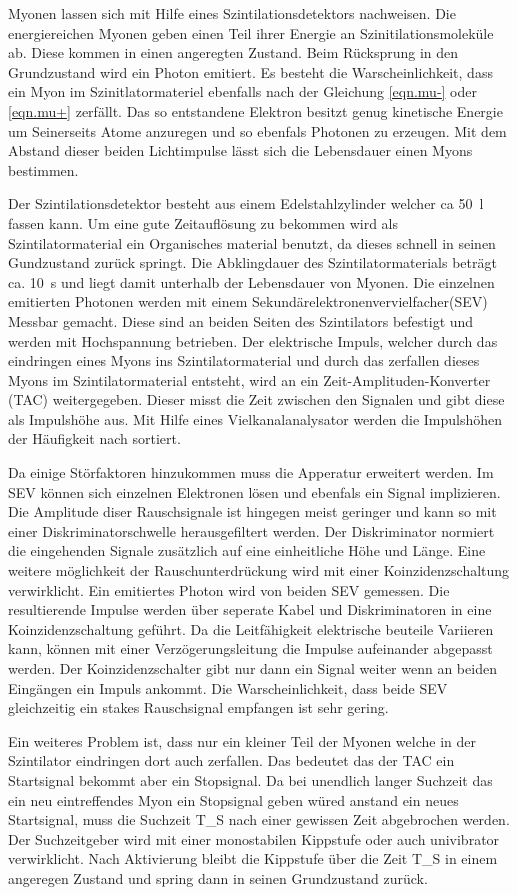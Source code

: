 Myonen lassen sich mit Hilfe eines Szintilationsdetektors nachweisen.
Die energiereichen Myonen geben einen Teil ihrer Energie an Szinitilationsmoleküle ab.
Diese kommen in einen angeregten Zustand.
Beim Rücksprung in den Grundzustand wird ein Photon emitiert.
Es besteht die Warscheinlichkeit, dass ein Myon im Szinitlatormateriel ebenfalls nach der Gleichung \ref{eqn.mu-}
oder \ref{eqn.mu+} zerfällt.
Das so entstandene Elektron besitzt genug kinetische Energie um Seinerseits Atome anzuregen und so ebenfals Photonen zu erzeugen.
Mit dem Abstand dieser beiden Lichtimpulse lässt sich die Lebensdauer einen Myons bestimmen.

Der Szintilationsdetektor besteht aus einem Edelstahlzylinder welcher ca \SI{50}{l} fassen kann.
Um eine gute Zeitauflösung zu bekommen wird als Szintilatormaterial ein Organisches material benutzt,
da dieses schnell in seinen Gundzustand zurück springt.
Die Abklingdauer des Szintilatormaterials beträgt ca. \SI{10}{s} und liegt damit unterhalb der Lebensdauer von Myonen.
Die einzelnen emitierten Photonen werden mit einem Sekundärelektronenvervielfacher(SEV) Messbar gemacht.
Diese sind an beiden Seiten des Szintilators befestigt und werden mit Hochspannung betrieben.
Der elektrische Impuls, welcher durch das eindringen eines Myons ins Szintilatormaterial
und durch das zerfallen dieses Myons im Szintilatormaterial entsteht,
wird an ein Zeit-Amplituden-Konverter (TAC) weitergegeben.
Dieser misst die Zeit zwischen den Signalen und gibt diese als Impulshöhe aus.
Mit Hilfe eines Vielkanalanalysator werden die Impulshöhen der Häufigkeit nach sortiert.

Da einige Störfaktoren hinzukommen muss die Apperatur erweitert werden.
Im SEV können sich einzelnen Elektronen lösen und ebenfals ein Signal implizieren.
Die Amplitude diser Rauschsignale ist hingegen meist geringer und kann so mit einer Diskriminatorschwelle herausgefiltert werden.
Der Diskriminator normiert die eingehenden Signale zusätzlich auf eine einheitliche Höhe und Länge.
Eine weitere möglichkeit der Rauschunterdrückung wird mit einer Koinzidenzschaltung verwirklicht.
Ein emitiertes Photon wird von beiden SEV gemessen.
Die resultierende Impulse werden über seperate Kabel und Diskriminatoren in eine Koinzidenzschaltung geführt.
Da die Leitfähigkeit elektrische beuteile Variieren kann,
können mit einer Verzögerungsleitung die Impulse aufeinander abgepasst werden.
Der Koinzidenzschalter gibt nur dann ein Signal weiter wenn an beiden Eingängen ein Impuls ankommt.
Die Warscheinlichkeit, dass beide SEV gleichzeitig ein stakes Rauschsignal empfangen ist sehr gering.

Ein weiteres Problem ist, dass nur ein kleiner Teil der Myonen welche in der Szintilator eindringen dort auch zerfallen.
Das bedeutet das der TAC ein Startsignal bekommt aber ein Stopsignal.
Da bei unendlich langer Suchzeit das ein neu eintreffendes Myon ein Stopsignal geben würed anstand ein neues Startsignal,
muss die Suchzeit T_S nach einer gewissen Zeit abgebrochen werden.
Der Suchzeitgeber wird mit einer monostabilen Kippstufe oder auch univibrator verwirklicht.
Nach Aktivierung bleibt die Kippstufe über die Zeit T_S in einem angeregen Zustand und spring dann in seinen Grundzustand zurück.
